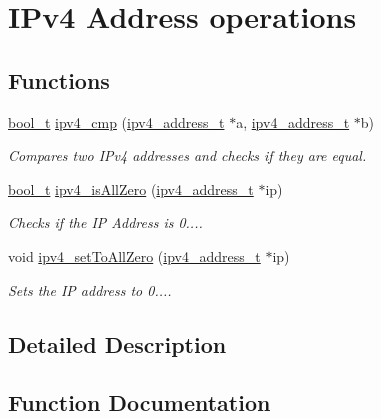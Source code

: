 \hypertarget{group__ip__operations}{}\section{I\+Pv4 Address operations}
\label{group__ip__operations}
\subsection*{Functions}
\begin{DoxyCompactItemize}
\item 
\mbox{\hyperlink{bool_8h_a449976458a084f880dc8e3d29e7eb6f5}{bool\+\_\+t}} \mbox{\hyperlink{group__ip__operations_gad9c08409a635759d19d5118a29baec3d}{ipv4\+\_\+cmp}} (\mbox{\hyperlink{group__ipv4_gad9df0882950e70d0587a4b423beb261a}{ipv4\+\_\+address\+\_\+t}} $\ast$a, \mbox{\hyperlink{group__ipv4_gad9df0882950e70d0587a4b423beb261a}{ipv4\+\_\+address\+\_\+t}} $\ast$b)
\begin{DoxyCompactList}\small\item\em Compares two I\+Pv4 addresses and checks if they are equal. \end{DoxyCompactList}\item 
\mbox{\hyperlink{bool_8h_a449976458a084f880dc8e3d29e7eb6f5}{bool\+\_\+t}} \mbox{\hyperlink{group__ip__operations_gaa00ec29f5a104d77f8f61f47da1fa9b6}{ipv4\+\_\+is\+All\+Zero}} (\mbox{\hyperlink{group__ipv4_gad9df0882950e70d0587a4b423beb261a}{ipv4\+\_\+address\+\_\+t}} $\ast$ip)
\begin{DoxyCompactList}\small\item\em Checks if the IP Address is 0.... \end{DoxyCompactList}\item 
void \mbox{\hyperlink{group__ip__operations_gac5383f68f84a2968218c92812354512a}{ipv4\+\_\+set\+To\+All\+Zero}} (\mbox{\hyperlink{group__ipv4_gad9df0882950e70d0587a4b423beb261a}{ipv4\+\_\+address\+\_\+t}} $\ast$ip)
\begin{DoxyCompactList}\small\item\em Sets the IP address to 0.... \end{DoxyCompactList}\end{DoxyCompactItemize}


\subsection{Detailed Description}


\subsection{Function Documentation}
\mbox{\label{group__ip__operations_gad9c08409a635759d19d5118a29baec3d}} 
